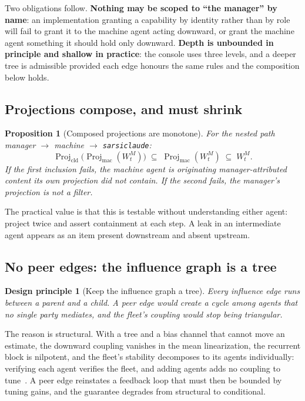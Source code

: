 \documentclass[11pt]{article}
\newtheorem{principle}{Design principle}
\newtheorem{proposition}{Proposition}
\newcommand{\code}[1]{\texttt{\small #1}}
\newcommand{\Proj}{\operatorname{Proj}}
\begin{document}
Two obligations follow. \textbf{Nothing may be scoped to ``the manager'' by name}: an implementation granting a capability by identity rather than by role will fail to grant it to the machine agent acting downward, or grant the machine agent something it should hold only downward. \textbf{Depth is unbounded in principle and shallow in practice}: the console uses three levels, and a deeper tree is admissible provided each edge honours the same rules and the composition below holds.

\subsection{Projections compose, and must shrink}

\begin{proposition}[Composed projections are monotone]
\label{prop:compose}
For the nested path manager $\to$ machine $\to$ \code{sarsi\-claude}:
\[
\Proj_{\mathrm{cld}}\big(\Proj_{\mathrm{mac}}(W^{M}_t)\big)\;\subseteq\;\Proj_{\mathrm{mac}}(W^{M}_t)\;\subseteq\;W^{M}_t .
\]
If the first inclusion fails, the machine agent is originating manager-attributed content its own projection did not contain. If the second fails, the manager's projection is not a filter.
\end{proposition}

The practical value is that this is testable without understanding either agent: project twice and assert containment at each step. A leak in an intermediate agent appears as an item present downstream and absent upstream.

\subsection{No peer edges: the influence graph is a tree}
\label{sec:tree}

\begin{principle}[Keep the influence graph a tree]
\label{prin:tree}
Every influence edge runs between a parent and a child. A peer edge would create a cycle among agents that no single party mediates, and the fleet's coupling would stop being triangular.
\end{principle}

The reason is structural. With a tree and a bias channel that cannot move an estimate, the downward coupling vanishes in the mean linearization, the recurrent block is nilpotent, and the fleet's stability decomposes to its agents individually: verifying each agent verifies the fleet, and adding agents adds no coupling to tune~\citep{yang2026manager}. A peer edge reinstates a feedback loop that must then be bounded by tuning gains, and the guarantee degrades from structural to conditional.
\end{document}
